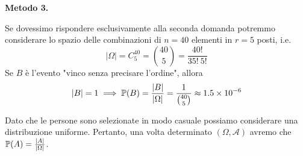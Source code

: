 \textbf{Metodo 3.}

Se dovessimo rispondere esclusivamente alla seconda domanda potremmo considerare lo spazio delle combinazioni di $n=40$ elementi in $r=5$ posti, i.e.
\begin{equation*}
| \Omega | =C_{5}^{40} =\binom{40}{5} =\frac{40!}{35!\ 5!}
\end{equation*}
Se $B$ è l'evento "vinco senza precisare l'ordine", allora
\begin{equation*}
| B| =1\implies \mathbb{P}( B) =\frac{| B| }{| \Omega | } =\frac{1}{\binom{40}{5}} \approx 1.5\times 10^{-6}
\end{equation*}

\Soluzione

Dato che le persone sono selezionate in modo casuale possiamo considerare una distribuzione uniforme. Pertanto, una volta determinato $( \Omega ,\mathcal{A})$ avremo che $\mathbb{P}( A) =\frac{| A| }{| \Omega | }$.
